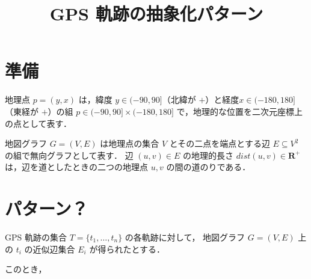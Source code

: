 \documentclass[11pt]{jsarticle}
\title{GPS 軌跡の抽象化パターン}
\author{}
\date{}
\begin{document}
\maketitle

\section{準備}

地理点 $p = (y, x)$ は，緯度 $y \in (-90,90]$（北緯が $+$）と経度$x \in (-180, 180]$（東経が $+$）の組 $p \in (-90, 90] \times (-180, 180]$ で，地理的な位置を二次元座標上の点として表す．

地図グラフ $G=(V, E)$ は地理点の集合 $V$ とその二点を端点とする辺 $E \subseteq V^2$ の組で無向グラフとして表す．
辺 $(u,v) \in E$ の地理的長さ $\mathit{dist}(u,v) \in \mathbf{R}^+$ は，辺を道としたときの二つの地理点 $u, v$ の間の道のりである．

\section{パターン？}

GPS 軌跡の集合 $T=\{t_1, \ldots, t_n\}$ の各軌跡に対して，
地図グラフ $G=(V,E)$ 上の $t_i$ の近似辺集合 $E_i$ が得られたとする．

このとき，
\end{document}
